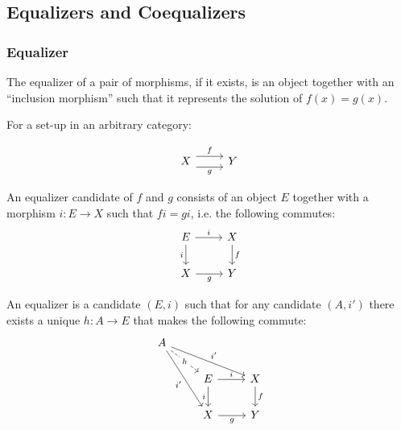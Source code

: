 \subsection{Equalizers and Coequalizers}

\subsubsection*{Equalizer}
The equalizer of a pair of morphisms, if it exists, is an object together with
an ``inclusion morphism'' such that it represents the solution of $f(x)=g(x)$.

\begin{definition}
  For a set-up in an arbitrary category:
  \parencite{leinster:basic_category_theory}

  \[\begin{tikzcd}[ampersand replacement=\&]
    X \& Y
    \arrow["f", shift left=2, from=1-1, to=1-2]
    \arrow["g"', shift right=2, from=1-1, to=1-2]
  \end{tikzcd}\]

  An equalizer candidate of $f$ and $g$ consists of an object $E$ together with
  a morphism $i:E\to X$ such that $fi = gi$, i.e. the following commutes:
  \[\begin{tikzcd}[ampersand replacement=\&]
    E \& X \\
    X \& Y
    \arrow["f", from=1-2, to=2-2]
    \arrow["g"', from=2-1, to=2-2]
    \arrow["i"', from=1-1, to=2-1]
    \arrow["i", from=1-1, to=1-2]
  \end{tikzcd}\]

  An equalizer is a candidate $(E, i)$ such that for any candidate $(A,
  i')$ there exists a unique $h:A\to E$ that makes the following commute:
  \[\begin{tikzcd}[ampersand replacement=\&]
    A \\
    \& E \& X \\
    \& X \& Y
    \arrow["i"', from=2-2, to=3-2]
    \arrow["i", from=2-2, to=2-3]
    \arrow["f", from=2-3, to=3-3]
    \arrow["g"', from=3-2, to=3-3]
    \arrow["{i'}"', from=1-1, to=3-2]
    \arrow["{i'}", from=1-1, to=2-3]
    \arrow["h"{description}, dashed, from=1-1, to=2-2]
  \end{tikzcd}\]
\end{definition}

